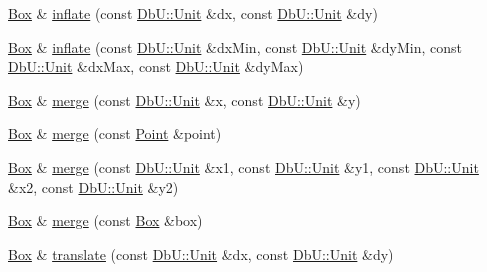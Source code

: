\begin{DoxyCompactItemize}
\item 
\mbox{\hyperlink{classHurricane_1_1Box}{Box}} \& \mbox{\hyperlink{classHurricane_1_1Box_a6b97ea9d54fbf4dae52459073cdf4b5f}{inflate}} (const \mbox{\hyperlink{group__DbUGroup_ga4fbfa3e8c89347af76c9628ea06c4146}{Db\+U\+::\+Unit}} \&dx, const \mbox{\hyperlink{group__DbUGroup_ga4fbfa3e8c89347af76c9628ea06c4146}{Db\+U\+::\+Unit}} \&dy)
\item 
\mbox{\hyperlink{classHurricane_1_1Box}{Box}} \& \mbox{\hyperlink{classHurricane_1_1Box_afd1baf9f272878a87c2525f0fa2eab71}{inflate}} (const \mbox{\hyperlink{group__DbUGroup_ga4fbfa3e8c89347af76c9628ea06c4146}{Db\+U\+::\+Unit}} \&dx\+Min, const \mbox{\hyperlink{group__DbUGroup_ga4fbfa3e8c89347af76c9628ea06c4146}{Db\+U\+::\+Unit}} \&dy\+Min, const \mbox{\hyperlink{group__DbUGroup_ga4fbfa3e8c89347af76c9628ea06c4146}{Db\+U\+::\+Unit}} \&dx\+Max, const \mbox{\hyperlink{group__DbUGroup_ga4fbfa3e8c89347af76c9628ea06c4146}{Db\+U\+::\+Unit}} \&dy\+Max)
\item 
\mbox{\hyperlink{classHurricane_1_1Box}{Box}} \& \mbox{\hyperlink{classHurricane_1_1Box_ab77fe56f9350f06cc872bbb4f83835da}{merge}} (const \mbox{\hyperlink{group__DbUGroup_ga4fbfa3e8c89347af76c9628ea06c4146}{Db\+U\+::\+Unit}} \&x, const \mbox{\hyperlink{group__DbUGroup_ga4fbfa3e8c89347af76c9628ea06c4146}{Db\+U\+::\+Unit}} \&y)
\item 
\mbox{\hyperlink{classHurricane_1_1Box}{Box}} \& \mbox{\hyperlink{classHurricane_1_1Box_af1f7dfe8984c2d26fbca78b21358ee2b}{merge}} (const \mbox{\hyperlink{classHurricane_1_1Point}{Point}} \&point)
\item 
\mbox{\hyperlink{classHurricane_1_1Box}{Box}} \& \mbox{\hyperlink{classHurricane_1_1Box_ad97e73e91dd36404eb0dde9d44ff2fd7}{merge}} (const \mbox{\hyperlink{group__DbUGroup_ga4fbfa3e8c89347af76c9628ea06c4146}{Db\+U\+::\+Unit}} \&x1, const \mbox{\hyperlink{group__DbUGroup_ga4fbfa3e8c89347af76c9628ea06c4146}{Db\+U\+::\+Unit}} \&y1, const \mbox{\hyperlink{group__DbUGroup_ga4fbfa3e8c89347af76c9628ea06c4146}{Db\+U\+::\+Unit}} \&x2, const \mbox{\hyperlink{group__DbUGroup_ga4fbfa3e8c89347af76c9628ea06c4146}{Db\+U\+::\+Unit}} \&y2)
\item 
\mbox{\hyperlink{classHurricane_1_1Box}{Box}} \& \mbox{\hyperlink{classHurricane_1_1Box_a0bdfa52a3f5f6639680ba7dbc52c21d7}{merge}} (const \mbox{\hyperlink{classHurricane_1_1Box}{Box}} \&box)
\item 
\mbox{\hyperlink{classHurricane_1_1Box}{Box}} \& \mbox{\hyperlink{classHurricane_1_1Box_aa689be4b37c83412f3dc95fc23c82156}{translate}} (const \mbox{\hyperlink{group__DbUGroup_ga4fbfa3e8c89347af76c9628ea06c4146}{Db\+U\+::\+Unit}} \&dx, const \mbox{\hyperlink{group__DbUGroup_ga4fbfa3e8c89347af76c9628ea06c4146}{Db\+U\+::\+Unit}} \&dy)
\end{DoxyCompactItemize}


